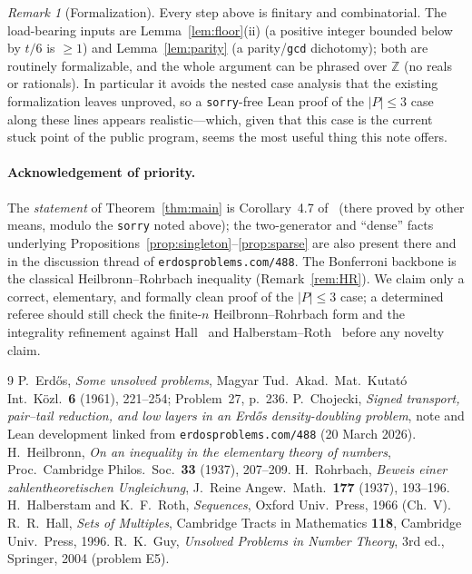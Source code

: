\documentclass[11pt]{article}
\theoremstyle{remark}
\newtheorem{remark}[theorem]{Remark}
\begin{document}
\begin{remark}[Formalization]
Every step above is finitary and combinatorial. The load-bearing inputs are
Lemma~\ref{lem:floor}(ii) (a positive integer bounded below by $t/6$ is $\ge 1$)
and Lemma~\ref{lem:parity} (a parity/\texttt{gcd} dichotomy); both are routinely
formalizable, and the whole argument can be phrased over $\mathbb Z$ (no reals or
rationals). In particular it avoids the nested case analysis that the existing
formalization leaves unproved, so a \texttt{sorry}-free Lean proof of the
$|P|\le 3$ case along these lines appears realistic---which, given that this case
is the current stuck point of the public program, seems the most useful thing this
note offers.
\end{remark}

\paragraph{Acknowledgement of priority.} The \emph{statement} of
Theorem~\ref{thm:main} is Corollary~4.7 of~\cite{Chojecki} (there proved by other
means, modulo the \texttt{sorry} noted above); the two-generator and ``dense''
facts underlying Propositions~\ref{prop:singleton}--\ref{prop:sparse} are also
present there and in the discussion thread of \texttt{erdosproblems.com/488}. The
Bonferroni backbone is the classical Heilbronn--Rohrbach inequality
(Remark~\ref{rem:HR}). We claim only a correct, elementary, and formally clean
proof of the $|P|\le 3$ case; a determined referee should still check the finite-$n$
Heilbronn--Rohrbach form and the integrality refinement against
Hall~\cite{Hall} and Halberstam--Roth~\cite{HalberstamRoth} before any novelty
claim.

\begin{thebibliography}{9}
 P.~Erd\H{o}s, \emph{Some unsolved problems}, Magyar Tud.\ Akad.\
Mat.\ Kutat\'o Int.\ K\"ozl.\ \textbf{6} (1961), 221--254; Problem~27, p.~236.
\bibitem{Chojecki} P.~Chojecki, \emph{Signed transport, pair--tail reduction, and
low layers in an Erd\H{o}s density-doubling problem}, note and Lean development
linked from \texttt{erdosproblems.com/488} (20 March 2026).
 H.~Heilbronn, \emph{On an inequality in the elementary theory
of numbers}, Proc.\ Cambridge Philos.\ Soc.\ \textbf{33} (1937), 207--209.
\bibitem{Rohrbach37} H.~Rohrbach, \emph{Beweis einer zahlentheoretischen
Ungleichung}, J.\ Reine Angew.\ Math.\ \textbf{177} (1937), 193--196.
\bibitem{HalberstamRoth} H.~Halberstam and K.~F.~Roth, \emph{Sequences},
Oxford Univ.\ Press, 1966 (Ch.~V).
 R.~R.~Hall, \emph{Sets of Multiples}, Cambridge Tracts in
Mathematics \textbf{118}, Cambridge Univ.\ Press, 1996.
 R.~K.~Guy, \emph{Unsolved Problems in Number Theory}, 3rd ed.,
Springer, 2004 (problem E5).
\end{thebibliography}
\end{document}
